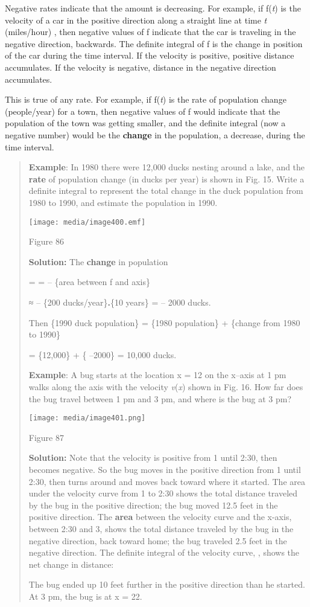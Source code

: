 Negative rates indicate that the amount is decreasing. For example, if
f(\emph{t}) is the velocity of a car in the positive direction along a
straight line at time \emph{t} (miles/hour) , then negative values of f
indicate that the car is traveling in the negative direction, backwards.
The definite integral of f is the change in position of the car during
the time interval. If the velocity is positive, positive distance
accumulates. If the velocity is negative, distance in the negative
direction accumulates.

This is true of any rate. For example, if f(\emph{t}) is the rate of
population change (people/year) for a town, then negative values of f
would indicate that the population of the town was getting smaller, and
the definite integral (now a negative number) would be the
\textbf{change} in the population, a decrease, during the time interval.

\begin{quote}
\textbf{Example}: In 1980 there were 12,000 ducks nesting around a lake,
and the \textbf{rate} of population change (in ducks per year) is shown
in Fig. 15. Write a definite integral to represent the total change in
the duck population from 1980 to 1990, and estimate the population in
1990.

\texttt{[image: media/image400.emf]}

Figure 86

\textbf{Solution:} The \textbf{change} in population

= = -- \{area between f and axis\}

≈ -- \{200 ducks/year\}\textbf{.}\{10 years\} = -- 2000 ducks.

Then \{1990 duck population\} = \{1980 population\} + \{change from 1980
to 1990\}

= \{12,000\} + \{ --2000\} = 10,000 ducks.

\textbf{Example}: A bug starts at the location x = 12 on the x--axis at
1 pm walks along the axis with the velocity \emph{v}(\emph{x}) shown in
Fig. 16. How far does the bug travel between 1 pm and 3 pm, and where is
the bug at 3 pm?

\texttt{[image: media/image401.png]}

Figure 87

\textbf{Solution:} Note that the velocity is positive from 1 until 2:30,
then becomes negative. So the bug moves in the positive direction from 1
until 2:30, then turns around and moves back toward where it started.
The area under the velocity curve from 1 to 2:30 shows the total
distance traveled by the bug in the positive direction; the bug moved
12.5 feet in the positive direction. The \textbf{area} between the
velocity curve and the x-axis, between 2:30 and 3, shows the total
distance traveled by the bug in the negative direction, back toward
home; the bug traveled 2.5 feet in the negative direction. The definite
integral of the velocity curve, , shows the net change in distance:

The bug ended up 10 feet further in the positive direction than he
started. At 3 pm, the bug is at x = 22.
\end{quote}

